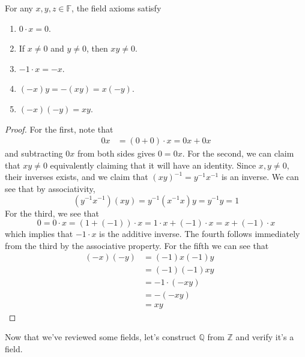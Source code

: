     \begin{lemma}
      For any $x, y, z \in \mathbb{F}$, the field axioms satisfy 
      \begin{enumerate}
        \item $0 \cdot x = 0$.
        \item If $x \neq 0$ and $y \neq 0$, then $x y \neq 0$.
        \item $-1 \cdot x = -x$. 
        \item $(-x) y = - (xy) = x (-y)$. 
        \item $(-x) (-y) = xy$. 
      \end{enumerate}
    \end{lemma} 
    \begin{proof}
      For the first, note that 
      \begin{align}
        0 x & = (0 + 0) \cdot x = 0 x + 0x 
      \end{align}
      and subtracting $0x$ from both sides gives $0 = 0x$. For the second, we can claim that $xy \neq 0$ equivalently claiming that it will have an identity. Since $x, y \neq 0$, their inverses exists, and we claim that $(xy)^{-1} = y^{-1} x^{-1}$ is an inverse. We can see that by associativity, 
      \begin{equation}
        (y^{-1} x^{-1}) (xy) = y^{-1} (x^{-1} x) y = y^{-1} y = 1
      \end{equation} 
      For the third, we see that 
      \begin{equation}
        0 = 0 \cdot x = (1 + (-1)) \cdot x = 1 \cdot x + (-1) \cdot x = x + (-1) \cdot x 
      \end{equation}
      which implies that $-1 \cdot x$ is the additive inverse. The fourth follows immediately from the third by the associative property. For the fifth we can see that 
      \begin{align}
        (-x) (-y) & = (-1) x (-1) y && \tag{property 3} \\
                  & = (-1) (-1) x y && \tag{$\times$ is commutative} \\
                  & = -1 \cdot (-xy) && \tag{property 3} \\
                  & = -(-xy) && \tag{property 3} \\
                  & = xy && \tag{addition property 4}
      \end{align}
    \end{proof}

    Now that we've reviewed some fields, let's construct $\mathbb{Q}$ from $\mathbb{Z}$ and verify it's a field. 

